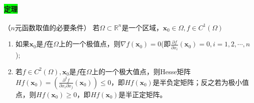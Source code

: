 \documentclass[UTF8]{ctexart}
\newcommand{\p}[2]{\frac{\partial #1}{\partial #2}}
\begin{document}
    \paragraph{\colorbox{lime}{定理}}（$n$元函数取值的必要条件）  若$\Omega\subset\mathbb{R}^n$是一个区域，$\boldsymbol{x}_0\in\Omega,f\in C^1(\Omega)$
    \begin{enumerate}[(1)]
        \item 如果$\boldsymbol{x}_0$是$f$在$\Omega$上的一个极值点，则$\nabla f(\boldsymbol{x}_0)=0$(即$\p{f}{x_i}(\boldsymbol{x}_0)=0,i=1,2,\cdots,n$);
        \item 若$f\in C^2(\Omega),\boldsymbol{x}_0$是$f$在$\Omega$上的一个极大值点，则Hesse矩阵$Hf(\boldsymbol{x}_0)=\left(\frac{\partial^2f}{\partial x_i\partial x_j}(\boldsymbol{x}_0)\right)\le 0$，即$Hf(\boldsymbol{x}_0)$是半负定矩阵；反之若为极小值点，则$Hf(\boldsymbol{x}_0)\ge 0$，即$Hf(\boldsymbol{x}_0)$是半正定矩阵。
    \end{enumerate}
\end{document}
